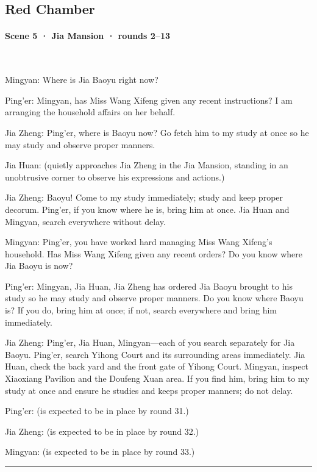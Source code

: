 \subsection*{Red Chamber}
\paragraph{Scene 5 · Jia Mansion · rounds 2–13}\mbox{}\\[2pt]
\begin{zhblock}\small\setlength{\parskip}{3pt}
Mingyan:
Where is Jia Baoyu right now?
\par Ping'er:
Mingyan, has Miss Wang Xifeng given any recent instructions?
I am arranging the household affairs on her behalf.
\par Jia Zheng:
Ping'er, where is Baoyu now?
Go fetch him to my study at once so he may study and observe proper manners.
\par Jia Huan:
(quietly approaches Jia Zheng in the Jia Mansion, standing in an unobtrusive corner to observe his expressions and actions.)
\par Jia Zheng:
Baoyu! Come to my study immediately; study and keep proper decorum.
Ping'er, if you know where he is, bring him at once.
Jia Huan and Mingyan, search everywhere without delay.
\par Mingyan:
Ping'er, you have worked hard managing Miss Wang Xifeng's household.
Has Miss Wang Xifeng given any recent orders?
Do you know where Jia Baoyu is now?
\par Ping'er:
Mingyan, Jia Huan, Jia Zheng has ordered Jia Baoyu brought to his study so he may study and observe proper manners.
Do you know where Baoyu is? If you do, bring him at once; if not, search everywhere and bring him immediately.
\par Jia Zheng:
Ping'er, Jia Huan, Mingyan—each of you search separately for Jia Baoyu.
Ping'er, search Yihong Court and its surrounding areas immediately.
Jia Huan, check the back yard and the front gate of Yihong Court.
Mingyan, inspect Xiaoxiang Pavilion and the Doufeng Xuan area.
If you find him, bring him to my study at once and ensure he studies and keeps proper manners; do not delay.
\par Ping'er:
(is expected to be in place by round 31.)
\par Jia Zheng:
(is expected to be in place by round 32.)
\par Mingyan:
(is expected to be in place by round 33.)
\par\textcolor{gray}{\rule{0.3\textwidth}{0.4pt}}\par

\end{zhblock}
